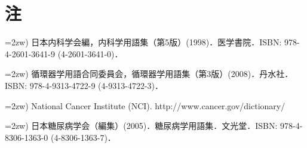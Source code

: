 \documentclass[japanese]{jnlp_1.4}
\begin{document}
\section*{注}


    \hangindent=2zw)
日本内科学会編，内科学用語集（第5版）(1998)．医学書院．ISBN: 978-4-2601-3641-9 (4-2601-3641-0)．

    \hangindent=2zw)
循環器学用語合同委員会，循環器学用語集（第3版）(2008)．丹水社．ISBN: 978-4-9313-4722-9 (4-9313-4722-3)．

    \hangindent=2zw)
National Cancer Institute (NCI). http://www.cancer.gov/dictionary/

    \hangindent=2zw)
日本糖尿病学会（編集）(2005)．糖尿病学用語集．文光堂．ISBN: 978-4-8306-1363-0 (4-8306-1363-7)．
\end{document}
